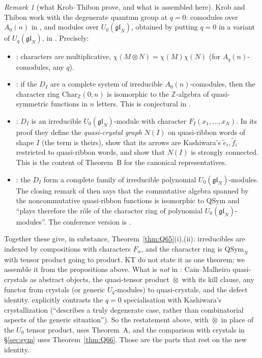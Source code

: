 \documentclass[11pt]{amsart}
\theoremstyle{definition}
\theoremstyle{remark}
\newtheorem{remark}[theorem]{Remark}
\newcommand{\qt}{\mathbin{\ddot\otimes}}
\newcommand{\QSym}{\mathrm{QSym}}
\begin{document}
\begin{remark}[what Krob--Thibon prove, and what is assembled here]\label{rem:KT}
Krob and Thibon work with the degenerate quantum group at $q=0$: comodules over $A_0(n)$ in \cite{KT4}, and modules over $U_0(\mathfrak{gl}_N)$, obtained by putting $q=0$ in a variant of $U_q(\mathfrak{gl}_N)$, in \cite{KT5}. Precisely:
\begin{itemize}[leftmargin=*]
\item \cite[Prop.~6.1(2), p.~366]{KT4}: characters are multiplicative, $\chi(M\otimes N)=\chi(M)\chi(N)$ (for $A_q(n)$-comodules, any $q$).
\item \cite[Conj.~6.13, Note~6.14, p.~371]{KT4}: if the $D_I$ are a complete system of irreducible $A_0(n)$-comodules, then the character ring $\mathrm{Char}_{\mathbb Z}(0;n)$ is isomorphic to the $\mathbb Z$-algebra of quasi-symmetric functions in $n$ letters. This is conjectural in \cite{KT4}.
\item \cite[Prop.~7.1]{KT5}: $D_I$ is an irreducible $U_0(\mathfrak{gl}_N)$-module with character $F_I(x_1,\dots,x_N)$. In its proof they define the \emph{quasi-crystal graph} $N(I)$ on quasi-ribbon words of shape $I$ (the term is theirs), show that its arrows are Kashiwara's $\tilde e_i,\tilde f_i$ restricted to quasi-ribbon words, and show that $N(I)$ is strongly connected. This is the content of Theorem~B for the canonical representatives.
\item \cite[Prop.~7.3(i)]{KT5}: the $D_I$ form a complete family of irreducible polynomial $U_0(\mathfrak{gl}_N)$-modules. The closing remark of \cite[\S7]{KT5} then says that the commutative algebra spanned by the noncommutative quasi-ribbon functions is isomorphic to $\QSym$ and ``plays therefore the r\^ole of the character ring of polynomial $U_0(\mathfrak{gl}_N)$-modules''. The conference version is \cite{KTfpsac}.
\end{itemize}
Together these give, in substance, Theorem~\ref{thm:Q65}(i),(ii): irreducibles are indexed by compositions with characters $F_\alpha$, and the character ring is $\QSym_N$ with tensor product going to product. KT do not state it as one theorem; we assemble it from the propositions above. What is \emph{not} in \cite{KT4,KT5}: Cain--Malheiro quasi-crystals as abstract objects, the quasi-tensor product $\qt$ with its kill clause, any functor from crystals (or generic $U_q$-modules) to quasi-crystals, and the defect identity. \cite[p.~353]{KT4} explicitly contrasts the $q=0$ specialisation with Kashiwara's crystallization (``describes a truly degenerate case, rather than combinatorial aspects of the generic situation''). So the restatement above, with $\qt$ in place of the $U_0$ tensor product, uses Theorem~A, and the comparison with crystals in \S\ref{sec:sym} uses Theorem~\ref{thm:Q66}. Those are the parts that rest on the new identity.
\end{remark}
\end{document}
